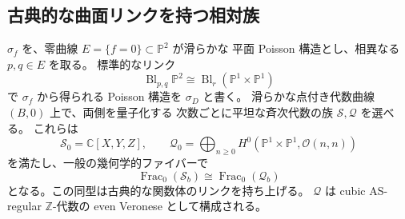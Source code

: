 \subsection{古典的な曲面リンクを持つ相対族}

\begin{proposition}\label{prop:relative-elliptic-surface-link}
$\sigma_f$ を、零曲線 $E=\{f=0\}\subset\mathbb P^2$ が滑らかな
平面 Poisson 構造とし、相異なる $p,q\in E$ を取る。
標準的なリンク
\[
 \operatorname{Bl}_{p,q}\mathbb P^2
 \cong \operatorname{Bl}_{r}(\mathbb P^1\times\mathbb P^1)
\]
で $\sigma_f$ から得られる Poisson 構造を $\sigma_D$ と書く。
滑らかな点付き代数曲線 $(B,0)$ 上で、両側を量子化する
次数ごとに平坦な斉次代数の族 $\mathcal S,\mathcal Q$ を選べる。
これらは
\[
 \mathcal S_0=\mathbb C[X,Y,Z],\qquad
 \mathcal Q_0=\bigoplus_{n\ge0}
 H^0(\mathbb P^1\times\mathbb P^1,\mathcal O(n,n))
\]
を満たし、一般の幾何学的ファイバーで
\[
 \operatorname{Frac}_0(\mathcal S_b)
 \cong \operatorname{Frac}_0(\mathcal Q_b)
 \tag{S6}
\]
となる。この同型は古典的な関数体のリンクを持ち上げる。
$\mathcal Q$ は cubic AS-regular $\mathbb Z$-代数の even Veronese として構成される。
\end{proposition}

